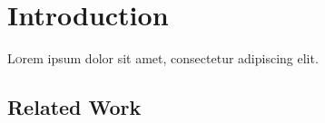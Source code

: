 \section{Introduction}

\lettrine[nindent=0em,lines=3]{L} orem ipsum dolor sit amet, consectetur adipiscing elit.



\subsection{Related Work}
